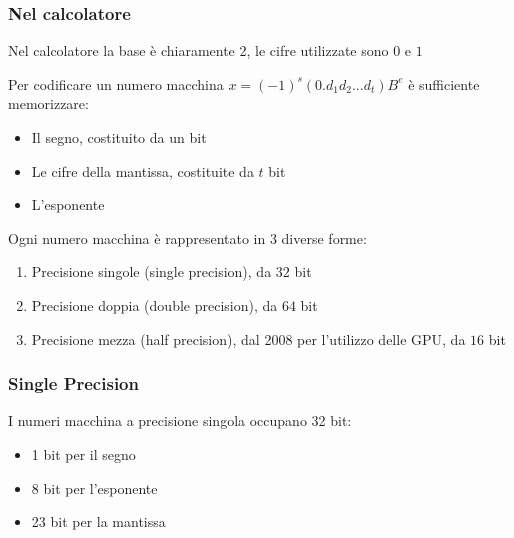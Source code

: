 \documentclass[a4paper, 11pt]{article}
\begin{document}
            \subsubsection*{Nel calcolatore}
            
            Nel calcolatore la base è chiaramente 2, le cifre utilizzate sono $0$ e $1$

            Per codificare un numero macchina $x = (-1)^s (0.d_1d_2...d_t)B^e$ è sufficiente memorizzare:

            \begin{itemize}
                \item Il segno, costituito da un bit
                
                \item Le cifre della mantissa, costituite da $t$ bit
                
                \item L'esponente
            \end{itemize}
                
            Ogni numero macchina è rappresentato in 3 diverse forme:

            \begin{enumerate}
                \item Precisione singole (single precision), da $32$ bit
                
                \item Precisione doppia (double precision), da $64$ bit
                
                \item Precisione mezza (half precision), dal 2008 per l'utilizzo delle GPU, da $16$ bit
                
            \end{enumerate}
                    
        \subsubsection{Single Precision}
            I numeri macchina a precisione singola occupano 32 bit: 
            \begin{itemize}
                \item 1 bit per il segno 
                
                \item 8 bit per l'esponente
                
                \item 23 bit per la mantissa
                
            \end{itemize}
            
\end{document}
